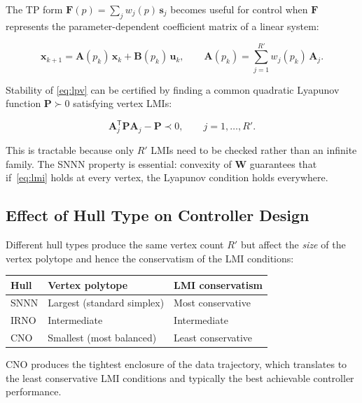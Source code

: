 \documentclass[11pt]{article}
\theoremstyle{definition}
\theoremstyle{plain}
\newcommand{\mat}[1]{\mathbf{#1}}
\newcommand{\T}{\mathsf{T}}
\begin{document}
The TP form $\mat{F}(p) = \sum_j w_j(p)\,\mat{s}_j$ becomes useful
for control when $\mat{F}$ represents the parameter-dependent coefficient
matrix of a linear system:

\begin{equation}
  \mat{x}_{k+1} = \mat{A}(p_k)\,\mat{x}_k + \mat{B}(p_k)\,\mat{u}_k,
  \qquad
  \mat{A}(p_k) = \sum_{j=1}^{R'} w_j(p_k)\,\mat{A}_j.
  \label{eq:lpv}
\end{equation}

Stability of \eqref{eq:lpv} can be certified by finding a common
quadratic Lyapunov function $\mat{P} \succ 0$ satisfying vertex LMIs:

\begin{equation}
  \mat{A}_j^\T\mat{P}\mat{A}_j - \mat{P} \prec 0,
  \qquad j = 1, \ldots, R'.
  \label{eq:lmi}
\end{equation}

This is tractable because only $R'$ LMIs need to be checked rather
than an infinite family.  The SNNN property is essential: convexity of
$\mat{W}$ guarantees that if~\eqref{eq:lmi} holds at every vertex,
the Lyapunov condition holds everywhere.

\subsection{Effect of Hull Type on Controller Design}

Different hull types produce the same vertex count $R'$ but affect the
\emph{size} of the vertex polytope and hence the conservatism of the LMI conditions:

\begin{center}
\begin{tabular}{lll}
\toprule
Hull & Vertex polytope & LMI conservatism \\
\midrule
SNNN & Largest (standard simplex) & Most conservative \\
IRNO & Intermediate & Intermediate \\
CNO  & Smallest (most balanced) & Least conservative \\
\bottomrule
\end{tabular}
\end{center}

CNO produces the tightest enclosure of the data trajectory, which
translates to the least conservative LMI conditions and typically the
best achievable controller performance.


\end{document}
